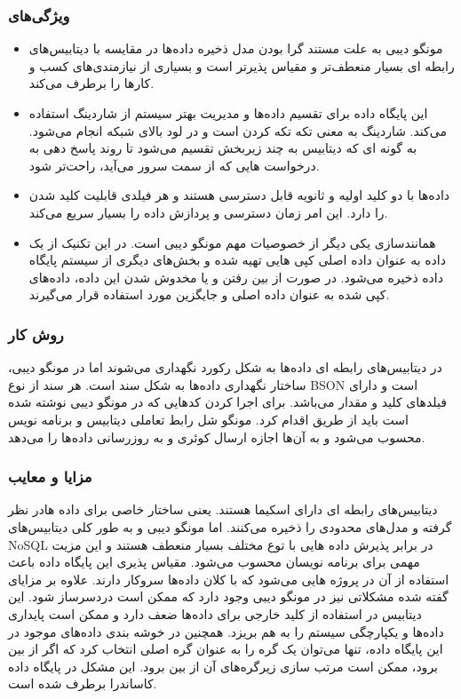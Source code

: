 \subsubsection{ویژگی‌های }
\begin{itemize}
	\item
مونگو دیبی به علت مستند گرا بودن مدل ذخیره داده‌ها در مقایسه با دیتابیس‌های رابطه ای بسیار منعطف‌تر و مقیاس پذیر‌تر است و بسیاری از نیازمندی‌های کسب و کارها را برطرف می‌کند.
\item
این پایگاه داده برای تقسیم داده‌ها و مدیریت بهتر سیستم از 
شاردینگ
 استفاده می‌کند. شاردینگ به معنی تکه تکه کردن است و در لود بالای شبکه انجام می‌شود. به گونه ای که دیتابیس به چند زیربخش تقسیم می‌شود تا روند پاسخ دهی به درخواست هایی که از سمت سرور می‌آید، راحت‌تر شود.
\item
داده‌ها با دو کلید اولیه و ثانویه قابل دسترسی هستند و هر فیلدی قابلیت کلید شدن را دارد. این امر زمان دسترسی و پردازش داده را بسیار سریع می‌کند.
\item
همانندسازی
 یکی دیگر از خصوصیات مهم مونگو دیبی است. در این تکنیک از یک داده به عنوان داده اصلی کپی هایی تهیه شده و بخش‌های دیگری از سیستم پایگاه داده ذخیره می‌شود. در صورت از بین رفتن و یا مخدوش شدن این داده، داده‌های کپی شده به عنوان داده اصلی و جایگزین مورد استفاده قرار می‌گیرند.
\end{itemize}

\subsubsection{روش کار }
در دیتابیس‌های رابطه ای داده‌ها به شکل 
رکورد
 نگهداری می‌شوند اما در مونگو دیبی، ساختار نگهداری داده‌ها به شکل سند است. هر سند از نوع
 BSON
  است و دارای فیلدهای کلید و مقدار می‌باشد.
برای اجرا کردن کدهایی که در مونگو دیبی نوشته شده است باید از طریق
 اقدام کرد. مونگو شل رابط تعاملی دیتابیس و برنامه نویس محسوب می‌شود و به آن‌ها اجازه ارسال 
 کوئری
  و به روزرسانی داده‌ها را می‌دهد.

\subsubsection{مزایا و معایب }
دیتابیس‌های رابطه ای دارای 
اسکیما
 هستند. یعنی ساختار خاصی برای داده هادر نظر گرفته و مدل‌های محدودی را ذخیره می‌کنند. اما مونگو دیبی و به طور کلی دیتابیس‌های NoSQL در برابر پذیرش داده هایی با توع مختلف بسیار منعطف هستند و این مزیت مهمی برای برنامه نویسان محسوب می‌شود. مقیاس پذیری این پایگاه داده باعث استفاده از آن در پروژه هایی می‌شود که با کلان داده‌ها
 سروکار دارند.
علاوه بر مزایای گفته شده مشکلاتی نیز در مونگو دیبی وجود دارد که ممکن است دردسرساز شود. این دیتابیس در استفاده از کلید خارجی
 برای داده‌ها ضعف دارد و ممکن است پایداری داده‌ها و یکپارچگی سیستم را به هم بریزد. همچنین در خوشه بندی داده‌های موجود در این پایگاه داده، تنها می‌توان یک 
 گره
  را به عنوان گره 
  اصلی
   انتخاب کرد که اگر از بین برود، ممکن است مرتب سازی زیرگره‌های آن از بین برود. این مشکل در پایگاه داده 
   کاساندرا
    برطرف شده است.


